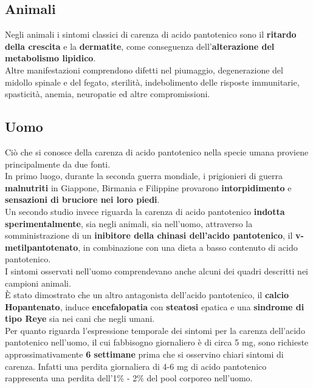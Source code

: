 \documentclass[a4paper, 12pt]{article}
\begin{document}
\subsection{Animali}
Negli animali i sintomi classici di carenza di acido pantotenico sono il \textbf{ritardo della crescita} e la \textbf{dermatite}, come conseguenza dell’\textbf{alterazione del metabolismo lipidico}.\\
Altre manifestazioni comprendono difetti nel piumaggio, degenerazione del midollo spinale e del fegato, sterilità, indebolimento delle risposte immunitarie, spasticità, anemia, neuropatie ed altre compromissioni.

\subsection{Uomo}
Ciò che si conosce della carenza di acido pantotenico nella specie umana proviene principalmente da due fonti.\\
In primo luogo, durante la seconda guerra mondiale, i prigionieri di guerra \textbf{malnutriti} in Giappone, Birmania e Filippine provarono \textbf{intorpidimento} e \textbf{sensazioni di bruciore nei loro piedi}.\\
Un secondo studio invece riguarda la carenza di acido pantotenico \textbf{indotta sperimentalmente}, sia negli animali, sia nell’uomo, attraverso la somministrazione di un \textbf{inibitore della chinasi dell’acido pantotenico}, il \textbf{v-metilpantotenato}, in combinazione con una dieta a basso contenuto di acido pantotenico.\\
I sintomi osservati nell’uomo comprendevano anche alcuni dei quadri descritti nei campioni animali.\\
È stato dimostrato che un altro antagonista dell'acido pantotenico, il \textbf{calcio Hopantenato}, induce \textbf{encefalopatia} con \textbf{steatosi} epatica e una \textbf{sindrome di tipo Reye} sia nei cani che negli umani.\\ Per quanto riguarda l’espressione temporale dei sintomi per la carenza dell’acido pantotenico nell’uomo, il cui fabbisogno giornaliero è di circa 5 mg, sono richieste approssimativamente \textbf{6 settimane} prima che si osservino chiari sintomi di carenza. Infatti una perdita giornaliera di 4-6 mg di acido pantotenico rappresenta una perdita dell’1\% - 2\% del pool corporeo nell’uomo.
\end{document}
